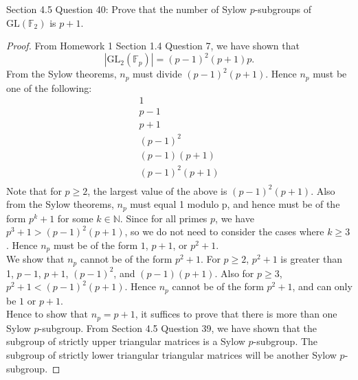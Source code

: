 Section 4.5 Question 40: Prove that the number of Sylow $p$-subgroups of
$\text{GL}(\mathbb{F}_2)$ is $p+1$.

\begin{proof}
  From Homework 1 Section 1.4 Question 7, we have shown that
  \begin{equation*}
    |\text{GL}_2(\mathbb{F}_p)|=(p-1)^2(p+1)p.
  \end{equation*}
  From the Sylow theorems, $n_p$ must divide $(p-1)^2(p+1)$. Hence $n_p$
  must be one of the following:
  \begin{align*}
    1 \\
    p-1 \\
    p+1 \\
    (p-1)^2 \\
    (p-1)(p+1) \\
    (p-1)^2(p+1) \\
  \end{align*}
  Note that for $p\geq2$, the largest value of the above is $(p-1)^2(p+1)$.
  Also from the Sylow theorems, $n_p$ must equal 1 modulo p, and hence must
  be of the form $p^k+1$ for some $k\in\mathbb{N}$. Since for all primes
  $p$, we have $p^3+1>(p-1)^2(p+1)$, so we do not need to consider the
  cases where $k\geq 3$. Hence $n_p$ must be of the form $1$, $p+1$, or
  $p^2+1$. \\

  We show that $n_p$ cannot be of the form $p^2+1$. For $p\geq2$, $p^2+1$
  is greater than 1, $p-1$, $p+1$, $(p-1)^2$, and $(p-1)(p+1)$. Also for
  $p\geq3$, $p^2+1<(p-1)^2(p+1)$. Hence $n_p$ cannot be of the form
  $p^2+1$, and can only be $1$ or $p+1$. \\

  Hence to show that $n_p=p+1$, it suffices to prove that there is more
  than one Sylow $p$-subgroup. From Section 4.5 Question 39, we have shown
  that the subgroup of strictly upper triangular matrices is a Sylow
  $p$-subgroup. The subgroup of strictly lower triangular triangular
  matrices will be another Sylow $p$-subgroup.
\end{proof}
